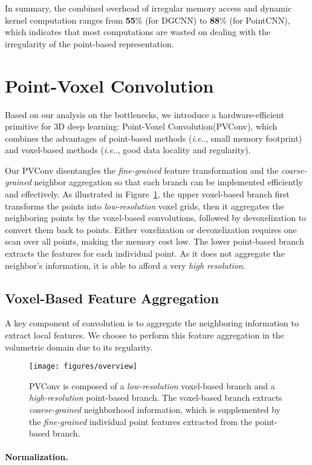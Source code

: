 \documentclass{article}
\makeatletter
\newcommand{\fig}[1]{Figure~\ref{#1}}
\DeclareRobustCommand\onedot{\futurelet\@let@token\@onedot}
\def\@onedot{\ifx\@let@token.\else.\null\fi\xspace}
\def\ie{\emph{i.e}\onedot} \def\Ie{\emph{I.e}\onedot}
\newcommand{\myparagraph}[1]{\vspace{-6pt}\paragraph{#1}}
\def\conv{Point-Voxel Convolution\xspace}
\def\convshort{PVConv\xspace}
\makeatother
\begin{document}
In summary, the combined overhead of irregular memory access and dynamic kernel computation ranges from \textbf{55}\% (for DGCNN) to \textbf{88}\% (for PointCNN), which indicates that most computations are wasted on dealing with the irregularity of the point-based representation.
 \section{Point-Voxel Convolution}

Based on our analysis on the bottlenecks, we introduce a hardware-efficient primitive for 3D deep learning: \conv (\convshort), which combines the advantages of point-based methods (\ie, small memory footprint) and voxel-based methods (\ie, good data locality and regularity).

Our \convshort disentangles the \emph{fine-grained} feature transformation and the \emph{coarse-grained} neighbor aggregation so that each branch can be implemented efficiently and effectively. As illustrated in \fig{fig:overview}, the upper voxel-based branch first transforms the points into \emph{low-resolution} voxel grids, then it aggregates the neighboring points by the voxel-based convolutions, followed by devoxelization to convert them back to points. Either voxelization or devoxelization requires one scan over all points, making the memory cost low. The lower point-based branch extracts the features for each individual point. As it does not aggregate the neighbor's information, it is able to afford a very \emph{high resolution}.

\subsection{Voxel-Based Feature Aggregation}

A key component of convolution is to aggregate the neighboring information to extract local features. We choose to perform this feature aggregation in the volumetric domain due to its regularity.

\begin{figure}[t]
\centering
\texttt{[image: figures/overview]}
\caption{\convshort is composed of a \emph{low-resolution} voxel-based branch and a \emph{high-resolution} point-based branch. The voxel-based branch extracts \emph{coarse-grained} neighborhood information, which is supplemented by the \emph{fine-grained} individual point features extracted from the point-based branch.}
\vspace{-10pt}
\label{fig:overview}
\end{figure} 
\myparagraph{Normalization.}
\end{document}
